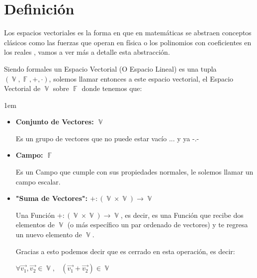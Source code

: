 \documentclass[12pt, fleqn]{report}                             %
\newenvironment{SmallIndentation}[1][0.75em]                    %
        {\begin{adjustwidth}{#1}{}\begin{footnotesize}}             %
        {\end{footnotesize}\end{adjustwidth}}                       %
\DeclareMathOperator \Space     {\quad}                         %
\DeclareMathOperator \MiniSpace {\;}                            %
\theoremstyle{break}                                            %
\DeclareMathOperator \GenericField {\mathbb{F}}                 %
\DeclareMathOperator \VectorSet    {\mathbb{V}}                 %
\begin{document}
        \section{Definición}

            Los espacios vectoriales es la forma en que en matemáticas se abstraen conceptos clásicos como las
            fuerzas que operan en física o los polinomios con coeficientes en los reales , vamos a ver más a detalle
            esta abstracción.

            Siendo formales un Espacio Vectorial (O Espacio Lineal) es una tupla 
            $(\VectorSet, \GenericField, +, \cdot)$, solemos llamar entonces a este espacio vectorial, 
            el Espacio Vectorial de $\VectorSet$ sobre $\GenericField$ donde tenemos que:
            
            \begin{SmallIndentation}[1em]
                
                \begin{itemize}
                
                    \item
                        \textbf{Conjunto de Vectores: $\VectorSet$}

                        Es un grupo de vectores que no puede estar vacío ... y ya -.- 

                    \item
                        \textbf{Campo: $\GenericField$}

                        Es un Campo que cumple con sus propiedades normales, le solemos llamar un campo escalar.

                    \item
                        \textbf{"Suma de Vectores": $+: (\VectorSet \times  \VectorSet) \to \VectorSet$}

                        Una Función $+: (\VectorSet \times  \VectorSet) \to \VectorSet$, es decir, es una Función
                        que recibe dos elementos de $\VectorSet$ (o más específico un par ordenado de vectores) y te
                        regresa un nuevo elemento de $\VectorSet$.

                        Gracias a esto podemos decir que es cerrado en esta operación, es decir:

                        $\forall \vec{v_1}, \vec{v_2} \in \VectorSet,
                            \MiniSpace (\vec{v_1} + \vec{v_2}) \in \VectorSet$  



\end{itemize}
\end{SmallIndentation}
\end{document}
